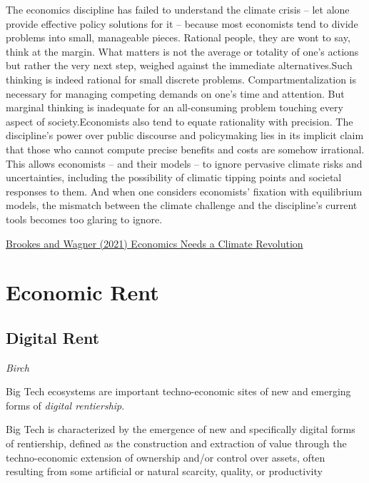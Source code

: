 \documentclass[
]{book}
\begin{document}
The economics discipline has failed to understand the climate crisis -- let alone provide effective policy solutions for it -- because most economists tend to divide problems into small, manageable pieces. Rational people, they are wont to say, think at the margin. What matters is not the average or totality of one's actions but rather the very next step, weighed against the immediate alternatives.Such thinking is indeed rational for small discrete problems. Compartmentalization is necessary for managing competing demands on one's time and attention. But marginal thinking is inadequate for an all-consuming problem touching every aspect of society.Economists also tend to equate rationality with precision. The discipline's power over public discourse and policymaking lies in its implicit claim that those who cannot compute precise benefits and costs are somehow irrational. This allows economists -- and their models -- to ignore pervasive climate risks and uncertainties, including the possibility of climatic tipping points and societal responses to them. And when one considers economists' fixation with equilibrium models, the mismatch between the climate challenge and the discipline's current tools becomes too glaring to ignore.

\href{https://www.project-syndicate.org/commentary/neoclassical-economics-fails-with-climate-change-by-tom-brookes-and-gernot-wagner-2021-06}{Brookes and Wagner (2021) Economics Needs a Climate Revolution}

\hypertarget{economic-rent}{%
\chapter{Economic Rent}\label{economic-rent}}

\hypertarget{digital-rent}{%
\section{Digital Rent}\label{digital-rent}}

\emph{Birch}

Big Tech ecosystems are important techno-economic sites of new and
emerging forms of \emph{digital rentiership}.

Big Tech is characterized by the emergence of new and specifically digital forms of rentiership, defined as the construction and extraction of value through the techno-economic extension of ownership and/or control over assets, often resulting from some artificial or natural scarcity, quality, or productivity
\end{document}
